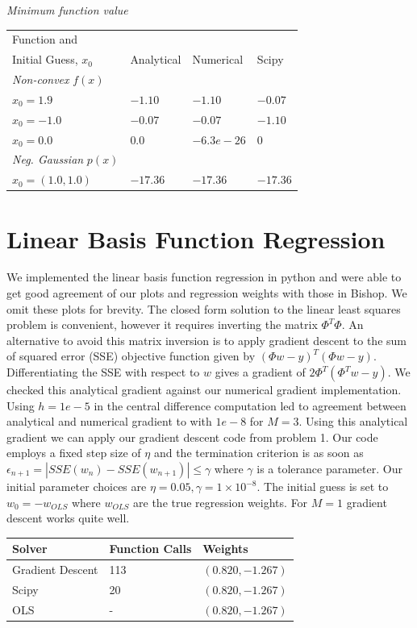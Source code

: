\documentclass[10pt]{article}
\begin{document}
\textit{Minimum function value}

\begin{tabular}{|l|l|l|l|}
\hline
Function and & & &\\ Initial Guess, $x_0$ & Analytical & Numerical & Scipy \\ \hline
\textit{Non-convex} $f(x)$ & & &\\ \hline
$x_0 = 1.9$ & $-1.10$ & $-1.10$ & $-0.07$\\\hline
$x_0 = -1.0$ & $-0.07$ & $-0.07$ & $-1.10$ \\ \hline
$x_0 = 0.0$ & $0.0$ & $-6.3e-26$ & $0$\\ \hline
\textit{Neg. Gaussian} $p(x)$ & & & \\ \hline
$x_0 = (1.0,1.0)$ & $-17.36$ & $-17.36$ & $-17.36$ \\ \hline
\end{tabular}



\section{Linear Basis Function Regression}
We implemented the linear basis function regression in python and were able to get good agreement of our plots and regression weights with those in Bishop. We omit these plots for brevity. The closed form solution to the linear least squares problem is convenient, however it requires inverting the matrix $\Phi^T \Phi$. An alternative to avoid this matrix inversion is to apply gradient descent to the sum of squared error (SSE) objective function given by $(\Phi w - y)^T(\Phi w - y)$. Differentiating the SSE with respect to $w$ gives a gradient of $2\Phi^T(\Phi^T w - y)$. We checked this analytical gradient against our numerical gradient implementation. Using $h = 1e-5$ in the central difference computation led to agreement between analytical and numerical gradient to with $1e-8$ for $M = 3$. Using this analytical gradient we can apply our gradient descent code from problem 1. Our code employs a fixed step size of $\eta$ and the termination criterion is as soon as $\epsilon_{n+1} = |SSE(w_n) - SSE(w_{n+1})| \leq \gamma $ where $\gamma$ is a tolerance parameter. Our initial parameter choices are $\eta = 0.05, \gamma = 1 \times 10^{-8}$. The initial guess is set to $w_0 = -w_{OLS}$ where $w_{OLS}$ are the true regression weights. For $M = 1$ gradient descent works quite well.

\begin{tabular}{|l|l|l|}
\hline
Solver & Function Calls & Weights \\ \hline
Gradient Descent & 113 & $(0.820, -1.267)$ \\ \hline
Scipy & 20 & $(0.820, -1.267)$ \\ \hline
OLS  & - & $(0.820, -1.267)$ \\ \hline
\end{tabular}
%
\end{document}
